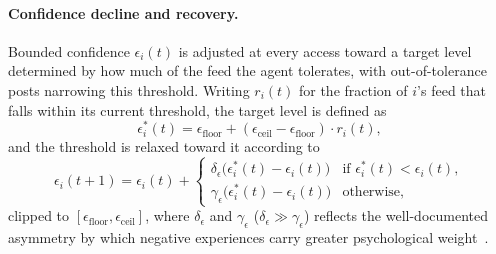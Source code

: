 \documentclass{svproc}
\def\BoundedConfidence{\epsilon} %
\begin{document}
\paragraph{Confidence decline and recovery.} 
Bounded confidence $\BoundedConfidence_i(t)$ is adjusted at every
access toward a target level determined by how much of the feed the
agent tolerates, with out-of-tolerance posts narrowing this
threshold. Writing $r_i(t)$ for the fraction of $i$'s feed that falls
within its current threshold, the target level is defined as
%
\begin{equation} 
  \BoundedConfidence_i^{\ast}(t) =
  \BoundedConfidence_{\mathrm{floor}} + (\BoundedConfidence_{\mathrm{ceil}}-\BoundedConfidence_{\mathrm{floor}})\cdot r_i(t), 
\end{equation} 
%
and the threshold is relaxed toward it according to 
%
\begin{equation} 
  \BoundedConfidence_i(t{+}1) = \BoundedConfidence_i(t) +
  \begin{cases}
    \delta_{\BoundedConfidence}\!
    \big(\BoundedConfidence_i^{\ast}(t)-\BoundedConfidence_i(t)\big)
    & \text{if } \BoundedConfidence_i^{\ast}(t) <
    \BoundedConfidence_i(t), \\[2pt]
    \gamma_{\BoundedConfidence}\!
    \big(\BoundedConfidence_i^{\ast}(t)-\BoundedConfidence_i(t)\big)
      & \text{otherwise},
  \end{cases}\label{eq:bc}
\end{equation} 
%
clipped to
$[\BoundedConfidence_{\mathrm{floor}},\BoundedConfidence_{\mathrm{ceil}}]$,
where $\delta_{\BoundedConfidence}$ and $\gamma_{\BoundedConfidence}$
($\delta_{\BoundedConfidence}\gg\gamma_{\BoundedConfidence}$)
reflects the well-documented asymmetry by which negative experiences
carry greater psychological weight~\cite{baumeister2001}.
\end{document}
